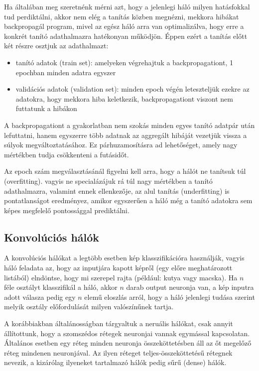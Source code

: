 \documentclass[12pt]{article}
\begin{document}
Ha általában meg szeretnénk mérni azt, hogy a jelenlegi háló milyen hatásfokkal tud perdiktálni, akkor nem elég a tanítás közben megnézni, mekkora hibákat backpropagál program, mivel az egész háló arra van optimalizálva, hogy erre a konkrét tanító adathalmazra hatékonyan működjön. Éppen ezért a tanítás előtt két részre osztjuk az adathalmazt:

\begin{itemize}  
	\item tanító adatok (train set): amelyeken végrehajtuk a backpropagationt, 1 epochban minden adatra egyszer
	\item validációs adatok (validation set): minden epoch végén leteszteljük ezekre az adatokra, hogy mekkora hiba keletkezik, backpropagationt viszont nem futtatunk a hibákon
\end{itemize}

A backpropagationt a gyakorlatban nem szokás minden egyes tanító adatpár után lefuttatni, hanem egyszerre több adatnak az aggregált hibáját vezetjük vissza a súlyok megváltoztatásához. Ez párhuzamosításra ad lehetőséget, amely nagy mértékben tudja csökkenteni a futásidőt.

Az epoch szám megválasztásánál figyelni kell arra, hogy a hálót ne tanítsuk túl (overfitting). vagyis ne specialázájuk rá túl nagy mértékben a tanító adathalmazra, valamint ennek ellenkezője, az alul tanítás (underfitting) is pontatlanságot eredményez, amikor egyszerűen a háló még a tanító adatokra sem képes megfelelő pontossággal prediktálni.

\subsection{Konvolúciós hálók}

A konvolúciós hálókat a legtöbb esetben kép klasszifikációra használják, vagyis háló feladata az, hogy az inputjára kapott képről (egy előre meghatározott listából) elndöntse, hogy  mi szerepel rajta (például: kutya vagy macska). Ha $n$ féle osztályt klasszifikál a háló, akkor $n$ darab output neuronja van, a kép inputra adott válasza pedig egy $n$ elemű eloszlás arról, hogy a háló jelenlegi tudása szerint melyik osztály előfordulását milyen valószínűnek tartja.

A korábbiakban általánosságban tárgyaltuk a neruális hálókat, csak annyit állítottunk, hogy a szomszédos rétegek neuronjai vannak egymással kapcsolatan. Általános esetben egy réteg minden neuronja összeköttetésben áll az őt megelőző réteg mindenen neuronjával. Az ilyen réteget teljes-összeköttetésű rétegnek nevezik, a kizárólag ilyeneket tartalmazó hálók pedig sűrű (dense) hálók.
\end{document}
